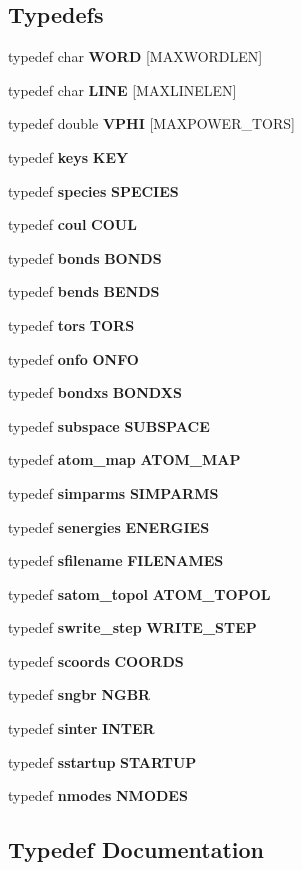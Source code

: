 \subsection*{Typedefs}
\begin{CompactItemize}
\item 
typedef char {\bf WORD} [MAXWORDLEN]
\item 
typedef char {\bf LINE} [MAXLINELEN]
\item 
typedef double {\bf VPHI} [MAXPOWER\_\-TORS]
\item 
typedef {\bf keys} {\bf KEY}
\item 
typedef {\bf species} {\bf SPECIES}
\item 
typedef {\bf coul} {\bf COUL}
\item 
typedef {\bf bonds} {\bf BONDS}
\item 
typedef {\bf bends} {\bf BENDS}
\item 
typedef {\bf tors} {\bf TORS}
\item 
typedef {\bf onfo} {\bf ONFO}
\item 
typedef {\bf bondxs} {\bf BONDXS}
\item 
typedef {\bf subspace} {\bf SUBSPACE}
\item 
typedef {\bf atom\_\-map} {\bf ATOM\_\-MAP}
\item 
typedef {\bf simparms} {\bf SIMPARMS}
\item 
typedef {\bf senergies} {\bf ENERGIES}
\item 
typedef {\bf sfilename} {\bf FILENAMES}
\item 
typedef {\bf satom\_\-topol} {\bf ATOM\_\-TOPOL}
\item 
typedef {\bf swrite\_\-step} {\bf WRITE\_\-STEP}
\item 
typedef {\bf scoords} {\bf COORDS}
\item 
typedef {\bf sngbr} {\bf NGBR}
\item 
typedef {\bf sinter} {\bf INTER}
\item 
typedef {\bf sstartup} {\bf STARTUP}
\item 
typedef {\bf nmodes} {\bf NMODES}
\end{CompactItemize}


\subsection{Typedef Documentation}
